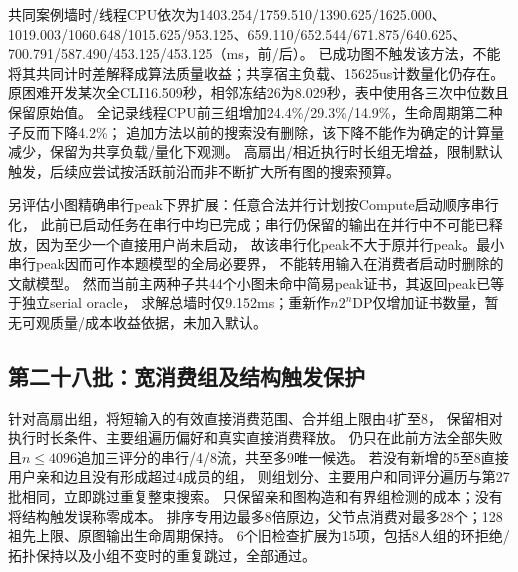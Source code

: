 \documentclass[UTF8,a4paper,11pt,fontset=fandol]{ctexart}
\begin{document}
共同案例墙时/线程CPU依次为1403.254/\allowbreak{}1759.510/\allowbreak{}1390.625/\allowbreak{}1625.000、1019.003/\allowbreak{}1060.648/\allowbreak{}1015.625/\allowbreak{}953.125、659.110/\allowbreak{}652.544/\allowbreak{}671.875/\allowbreak{}640.625、700.791/\allowbreak{}587.490/\allowbreak{}453.125/\allowbreak{}453.125（ms，前/后）。
已成功图不触发该方法，不能将其共同计时差解释成算法质量收益；共享宿主负载、15625us计数量化仍存在。
原困难开发某次全CLI16.509秒，相邻冻结26为8.029秒，表中使用各三次中位数且保留原始值。
全记录线程CPU前三组增加24.4\%/29.3\%/14.9\%，生命周期第二种子反而下降4.2\%；
追加方法以前的搜索没有删除，该下降不能作为确定的计算量减少，保留为共享负载/量化下观测。
高扇出/相近执行时长组无增益，限制默认触发，后续应尝试按活跃前沿而非不断扩大所有图的搜索预算。

另评估小图精确串行peak下界扩展：任意合法并行计划按Compute启动顺序串行化，
此前已启动任务在串行中均已完成；串行仍保留的输出在并行中不可能已释放，因为至少一个直接用户尚未启动，
故该串行化peak不大于原并行peak。最小串行peak因而可作本题模型的全局必要界，
不能转用输入在消费者启动时删除的文献模型。
然而当前主两种子共44个小图未命中简易peak证书，其返回peak已等于独立serial oracle，
求解总墙时仅9.152ms；重新作$n2^n$DP仅增加证书数量，暂无可观质量/成本收益依据，未加入默认。

\subsection{第二十八批：宽消费组及结构触发保护}
针对高扇出组，将短输入的有效直接消费范围、合并组上限由4扩至8，
保留相对执行时长条件、主要组遍历偏好和真实直接消费释放。
仍只在此前方法全部失败且$n\le4096$追加三评分的串行/4/8流，共至多9唯一候选。
若没有新增的5至8直接用户亲和边且没有形成超过4成员的组，
则组划分、主要用户和同评分遍历与第27批相同，立即跳过重复整束搜索。
只保留亲和图构造和有界组检测的成本；没有将结构触发误称零成本。
排序专用边最多8倍原边，父节点消费对最多28个；128祖先上限、原图输出生命周期保持。
6个旧检查扩展为15项，包括8人组的环拒绝/拓扑保持以及小组不变时的重复跳过，全部通过。
\end{document}
